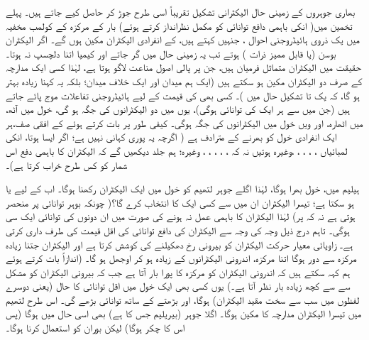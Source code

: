 بھاری جوہروں کے زمینی حال الیکٹرانی تشکیل تقریباً اسی طرح جوڑ کر حاصل کیے جاتے ہیں۔ پہلے تخمین میں( انکی باہمی دافع توانائی کو مکمل نظرانداز کرتے ہوئے) بار  کے مرکزہ کے کولمب مخفیہ میں یک ذروی ہائیڈروجنی احوال ، جنہیں  کہتے ہیں، کے انفرادی الیکٹران مکین ہوں گے۔ اگر الیکٹران بوسن (یا قابل ممیز ذرات ) ہوتے تب یہ زمینی حال  میں گر جاتے اور کیمیا اتنا دلچسپ نہ ہوتا۔ حقیقت میں الیکٹران متماثل فرمیان ہیں، جن پر پالی اصول مناعت لاگو ہوتا ہے، لہٰذا کسی ایک مدارچہ کے صرف دو الیکٹران مکین ہو سکتے ہیں (ایک ہم میدان اور ایک خلاف میدان؛ بلکہ یہ کہنا زیادہ بہتر ہو گا، کہ یک تا تشکیل حال میں )۔ کسی بھی  کی قیمت کے لیے  ہائیڈروجنی تفاعلات موج پائے جاتے ہیں (جن میں سے ہر ایک کی توانائی  ہوگی)، یوں   میں دو الیکٹرانوں کی جگہ ہو گی،  خول میں آٹھ،  میں اٹھارہ، اور ویں خول میں  الیکٹرانوں کی جگہ ہوگی۔ کیفی طور پر بات کرتے ہوئے  کے افقی صف،ہر ایک انفرادی خول کو بھرنے کے مترادف ہے ( اگرچہ یہ پوری کہانی نہیں ہے؛ اگر ایسا ہوتا، انکی لمبائیاں ، ، ، ، ،وغیرہ ہوتیں نہ کہ ، ، ، ، ، وغیرہ؛ ہم جلد دیکھیں گے کہ الیکٹران کا باہمی دفع اس شمار کو کس طرح خراب کرتا ہے)۔

ہیلیم میں،  خول بھرا ہوگا، لہٰذا اگلے جوہر لتھیم  کو  خول میں ایک الیکٹران رکھنا ہوگا۔ اب  کے لیے  یا  ہو سکتا ہے؛ تیسرا الیکٹران ان میں سے کسی ایک کا انتخاب کرے گا؟( چونکہ بوہر توانائی  پر منحصر ہوتی ہے نہ کہ  پر) لہٰذا الیکٹران کا باہمی عمل نہ ہونے کی صورت میں ان دونوں کی توانائی ایک سی ہوگی۔ تاہم درج ذیل وجہ کی وجہ سے الیکٹران کی دافع توانائی  کی اقل قیمت کی طرف داری کرتی ہے۔ زاویائی معیار حرکت الیکٹران کو بیرونی رخ دھکیلنے کی کوشش کرتا ہے اور الیکٹران جتنا زیادہ مرکزہ سے دور ہوگا اتنا مرکزہ، اندرونی الیکٹرانوں کے زیادہ  ہو کر اوجھل ہو گا۔ (اندازاً بات کرتے ہوئے ہم کہہ سکتے ہیں کہ اندرونی الیکٹران کو مرکزہ کا پورا بار   آتا ہے جب کہ بیرونی الیکٹران کو مشکل سے  سے کچھ زیادہ بار نظر آتا ہے۔) یوں کسی بھی ایک خول میں اقل توانائی کا حال (یعنی دوسرے لفظوں میں سب سے سخت مقید الیکٹران)  ہوگا، اور بڑھتے  کے ساتھ توانائی بڑھے گی۔ اس طرح لتھیم میں تیسرا الیکٹران مدارچہ  کا مکین ہوگا۔ اگلا جوہر (بیریلیم جس کا  ہے) بھی اسی حال میں ہوگا (پس اس کا چکر  ہوگا) لیکن بوران  کو  استعمال کرنا ہوگا۔ 
 

